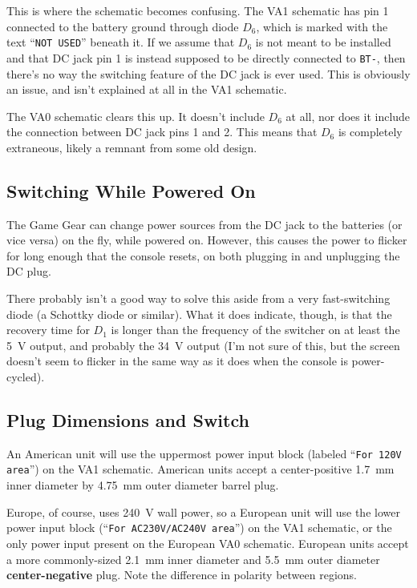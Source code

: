 \documentclass{article}
\newcommand{\chippin}{\texttt}
\newcommand{\model}{\textsf}
\begin{document}
This is where the schematic becomes confusing. The \model{VA1}
schematic has pin 1 connected to the battery ground through diode
$D_6$, which is marked with the text ``\texttt{NOT USED}'' beneath
it. If we assume that $D_6$ is not meant to be installed and that DC
jack pin 1 is instead supposed to be directly connected to
\chippin{BT-}, then there's no way the switching feature of the DC
jack is ever used. This is obviously an issue, and isn't explained at
all in the \model{VA1} schematic.

The \model{VA0} schematic clears this up. It doesn't include $D_6$ at
all, nor does it include the connection between DC jack pins 1 and
2. This means that $D_6$ is completely extraneous, likely a remnant
from some old design.

\subsection{Switching While Powered On}
The Game Gear can change power sources from the DC jack to the
batteries (or vice versa) on the fly, while powered on. However, this
causes the power to flicker for long enough that the console resets,
on both plugging in and unplugging the DC plug.

There probably isn't a good way to solve this aside from a very
fast-switching diode (a Schottky diode or similar). What it does
indicate, though, is that the recovery time for $D_1$ is longer than
the frequency of the switcher on at least the \qty{5}{\volt} output,
and probably the \qty{34}{\volt} output (I'm not sure of this, but the
screen doesn't seem to flicker in the same way as it does when the
console is power-cycled).

\subsection{Plug Dimensions and Switch}
\label{sec:plug_dimensions}
An American unit will use the uppermost power input block (labeled
``\texttt{For 120V area}'') on the \model{VA1} schematic. American
units accept a center-positive \qty{1.7}{\milli\meter} inner diameter
by \qty{4.75}{\milli\meter} outer diameter barrel plug.

Europe, of course, uses \qty{240}{\volt} wall power, so a European
unit will use the lower power input block (``\texttt{For AC230V/AC240V
  area}'') on the \model{VA1} schematic, or the only power input
present on the European \model{VA0} schematic. European units accept a
more commonly-sized \qty{2.1}{\milli\meter} inner diameter and
\qty{5.5}{\milli\meter} outer diameter \textbf{center-negative}
plug. Note the difference in polarity between regions.
\end{document}
